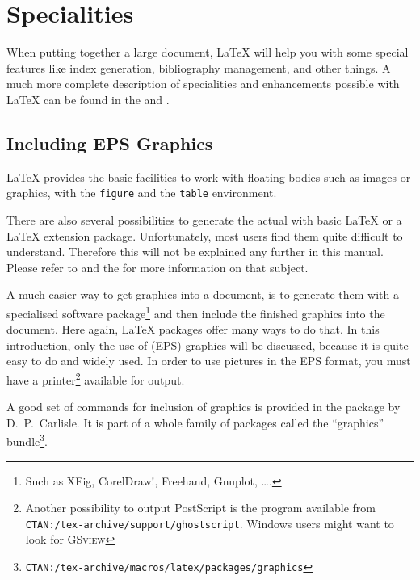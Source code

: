 ﻿%
 
\chapter{Specialities}
\begin{intro}
  When putting together a large document, \LaTeX{} will help you
  with some special features like index generation,
  bibliography management, and other things.
  A much more complete description of specialities and
  enhancements possible with \LaTeX{} can be found in the
  {\normalfont\manual{}} and {\normalfont \companion}.
\end{intro}

\section{Including EPS Graphics}
\LaTeX{} provides the basic facilities to work with floating bodies
such as images or graphics, with the \texttt{figure} and the
\texttt{table} environment.

There are also several possibilities to generate the actual
 with basic \LaTeX{} or a \LaTeX{} extension package.
Unfortunately, most users find them quite difficult to understand.
Therefore this will not be explained any further in this manual.
Please refer to \companion{} and the \manual{} for more information on
that subject.

A much easier way to get graphics into a document, is to generate them
with a specialised software package\footnote{Such as XFig, CorelDraw!,
  Freehand, Gnuplot, \ldots.} and then include the finished graphics
into the document. Here again, \LaTeX{} packages offer many ways to do
that. In this introduction, only the use of  (EPS) graphics will be discussed, because it is quite
easy to do and widely used.  In order to use pictures in the EPS
format, you must have a  printer\footnote{Another
  possibility to output PostScript is the \textsc{}
  program available from
  \texttt{CTAN:/tex-archive/support/ghostscript}. Windows users might
  want to look for \textsc{GSview}} available for output.

A good set of commands for inclusion of graphics is provided in the
 package by D.~P.~Carlisle. It is part of a whole family
of packages called the ``graphics''
bundle\footnote{\texttt{CTAN:/tex-archive/macros/latex/packages/graphics}}.

